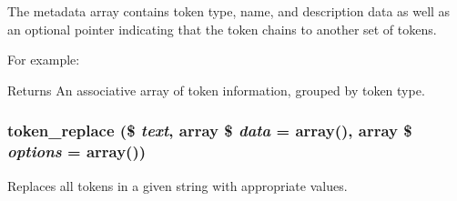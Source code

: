 The metadata array contains token type, name, and description data as well as an optional pointer indicating that the token chains to another set of tokens.

For example: 


\begin{DoxyReturn}{Returns}
An associative array of token information, grouped by token type. 
\end{DoxyReturn}
\hypertarget{includes_2token_8inc_a47eb294b05ca8d04439a9a82ccc4d82a}{
\subsubsection[{token\_\-replace}]{\setlength{\rightskip}{0pt plus 5cm}token\_\-replace (\$ {\em text}, \/  array \$ {\em data} = {\ttfamily array()}, \/  array \$ {\em options} = {\ttfamily array()})}}
\label{includes_2token_8inc_a47eb294b05ca8d04439a9a82ccc4d82a}
Replaces all tokens in a given string with appropriate values.


